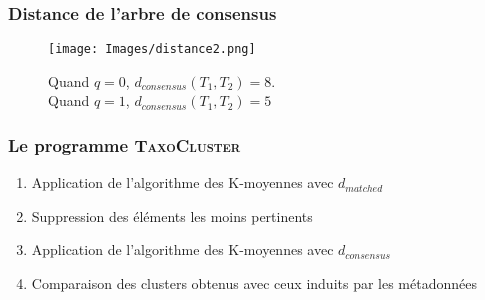 \documentclass{beamer}
\begin{document}
\begin{frame}
\frametitle{Distance de l'arbre de consensus}

\begin{figure}
\centering
\texttt{[image: Images/distance2.png]}
\caption{Quand $q = 0$, $d_{consensus}(T_{1},T_{2}) = 8$.\\Quand $q = 1$, $d_{consensus}(T_{1},T_{2}) = 5$}
\end{figure}

\end{frame}

\begin{frame}
\frametitle{Le programme \textsc{\bf TaxoCluster}}



\begin{enumerate}
\item Application de l'algorithme des K-moyennes avec $d_{matched}$
\bigskip
\pause
\item Suppression des éléments les moins pertinents 
\bigskip
\pause
\item Application de l'algorithme des K-moyennes avec $d_{consensus}$
\bigskip
\pause
\item Comparaison des \alert{clusters} obtenus avec ceux induits par les métadonnées
\end{enumerate}

\end{frame}
\end{document}
